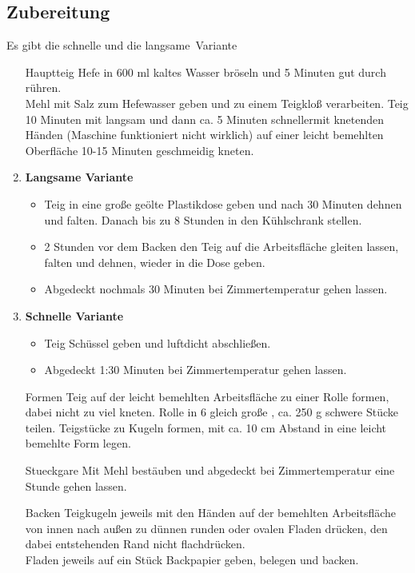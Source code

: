 \subsection*{Zubereitung}

Es gibt die schnelle und die \glqq langsame\grqq\ Variante
\begin{enumerate}
    \item [\Gls{Hauptteig}] Hefe in 600 ml kaltes Wasser bröseln und 5 Minuten gut durch rühren.\\
    Mehl mit Salz zum Hefewasser geben und zu einem Teigkloß verarbeiten. Teig 10 Minuten mit langsam und dann ca. 5 Minuten schnellermit knetenden Händen (Maschine funktioniert nicht wirklich) auf einer leicht bemehlten Oberfläche 10-15 Minuten geschmeidig kneten.
    \item  \textbf{Langsame Variante}
    \begin{itemize}
        \item Teig in eine große geölte Plastikdose geben und nach 30 Minuten dehnen und falten. Danach bis zu 8 Stunden in den Kühlschrank stellen. 
        \item 2 Stunden vor dem Backen den Teig auf die Arbeitsfläche gleiten lassen, falten und dehnen, wieder in die Dose geben.
        \item Abgedeckt nochmals 30 Minuten bei Zimmertemperatur gehen lassen. 
    \end{itemize}
    \item \textbf{Schnelle Variante}
    \begin{itemize}
        \item Teig Schüssel geben und luftdicht abschließen.
        \item Abgedeckt 1:30 Minuten bei Zimmertemperatur gehen lassen. 
    \end{itemize}
    \item [\Gls{Formen}] Teig auf der leicht bemehlten Arbeitsfläche zu einer Rolle formen, dabei nicht zu viel kneten.
    Rolle in 6 gleich große , ca. 250 g schwere Stücke teilen.
    Teigstücke zu Kugeln formen, mit ca. 10 cm Abstand in eine leicht bemehlte Form legen. 
    \item [\Gls{Stueckgare}] Mit Mehl bestäuben und abgedeckt bei Zimmertemperatur eine Stunde gehen lassen.
    \item [\Gls{Backen}] Teigkugeln jeweils mit den Händen auf der bemehlten Arbeitsfläche von innen nach außen zu dünnen runden oder ovalen Fladen drücken, den dabei entstehenden Rand nicht flachdrücken. \\
    Fladen jeweils auf ein Stück Backpapier geben, belegen und backen.
\end{enumerate}
%
